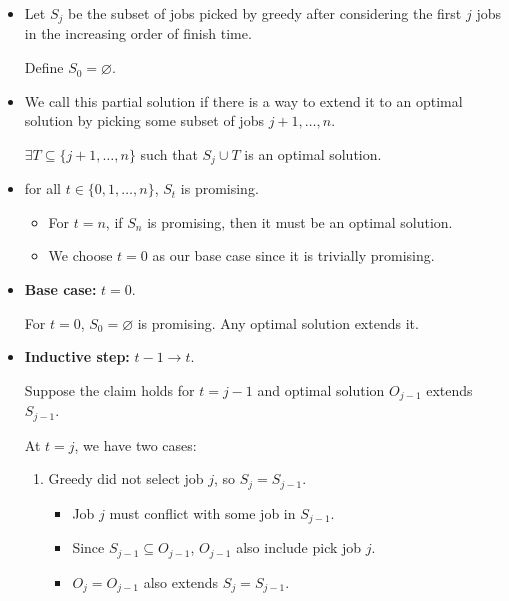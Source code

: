 \begin{itemize}
    \item Let $S_j$ be the subset of jobs picked by greedy after considering the first $j$ jobs in the increasing order of finish time.

    Define $S_0 = \varnothing$.

    \item We call this partial solution  if there is a way to extend it to an optimal solution by picking some subset of jobs $j + 1, \dots, n$.

    $\exists T \subseteq \{j + 1, \dots, n\}$ such that $S_j \cup T$ is an optimal solution.

    \item {} for all $t \in \{0, 1, \dots, n\}$, $S_t$ is promising.

    \begin{itemize}
        \item For $t = n$, if $S_n$ is promising, then it must be an optimal solution.

        \item We choose $t = 0$ as our base case since it is trivially promising.
    \end{itemize}

    \item \textbf{Base case:} $t = 0$.

    For $t = 0$, $S_0 = \varnothing$ is promising. Any optimal solution extends it.

    \item \textbf{Inductive step:} $t - 1 \to t$.

    Suppose the claim holds for $t = j - 1$ and optimal solution $O_{j-1}$ extends $S_{j-1}$.

    At $t = j$, we have two cases:

    \begin{enumerate}
        \item Greedy did not select job $j$, so $S_j = S_{j-1}$.

        \begin{itemize}
            \item Job $j$ must conflict with some job in $S_{j-1}$.
            \item Since $S_{j-1} \subseteq O_{j-1}$, $O_{j-1}$ also include pick job $j$.
            \item $O_j = O_{j-1}$ also extends $S_j = S_{j-1}$.
        \end{itemize}


\end{enumerate}
\end{itemize}
